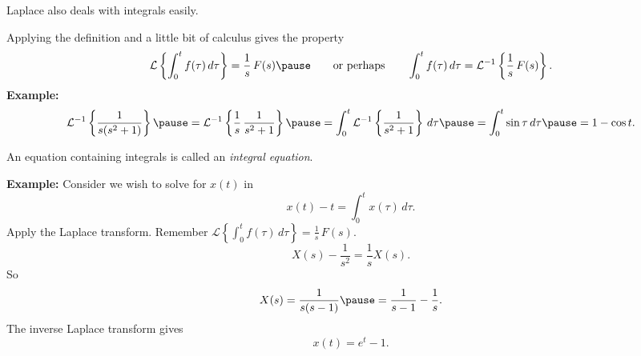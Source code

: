 \documentclass[10pt,aspectratio=169]{beamer}
\begin{document}
\begin{frame}
Laplace also deals with integrals easily.

\medskip
\pause

Applying the definition and a little bit of calculus gives
the property
\[
\mathcal{L} \left\{
\int_0^t f(\tau) \, d\tau
\right\} = \frac{1}{s} \, F(s)
\pause
\qquad
\text{or perhaps}
\qquad
\int_0^t f(\tau) \, d\tau
=
{\mathcal{L}}^{-1} \left\{
\frac{1}{s} \, F(s) \right\} .
\]
\pause
\textbf{Example:}
\[
{\mathcal{L}}^{-1} \left\{
\frac{1}{s(s^2+1)} \right\} 
\pause
=
{\mathcal{L}}^{-1} \left\{
\frac{1}{s} \, \frac{1}{s^2+1} \right\} 
\pause
=
\int_0^t 
{\mathcal{L}}^{-1} \left\{
\frac{1}{s^2+1} \right\} \, d\tau
\pause
=
\int_0^t 
\sin \tau \, d\tau
\pause
=
1 - \cos t .
\]
\end{frame}

\begin{frame}
An equation containing integrals is called an \emph{integral equation}.

\medskip
\pause

\textbf{Example:}
Consider we wish to solve for $x(t)$ in
\[
x(t) - t = \int_0^t x(\tau) \, d\tau .
\]
\pause
Apply the Laplace transform.  Remember
$\mathcal{L} \left\{
\int_0^t f(\tau) \, d\tau
\right\} = \frac{1}{s} \, F(s)$.
\[
X(s) - \frac{1}{s^2} = \frac{1}{s} X(s) .
\]
\pause
So
\[
X(s) = \frac{1}{s(s-1)} \pause = \frac{1}{s-1} - \frac{1}{s} .
\]
\pause
The inverse Laplace transform gives
\[
x(t) = e^t - 1 .
\]
\end{frame}
\end{document}
